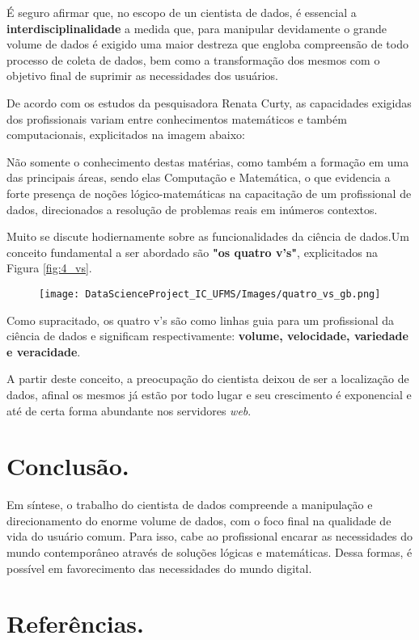 \documentclass[12pt]{article}
\begin{document}
É seguro afirmar que, no escopo de un cientista de dados, é essencial a \textbf{interdisciplinalidade}
a medida que, para manipular devidamente o grande volume de dados é exigido uma maior destreza que engloba compreensão de todo processo de coleta de dados, bem como a transformação dos mesmos com o objetivo final de suprimir as necessidades dos usuários.

De acordo com os estudos da pesquisadora Renata Curty, as capacidades exigidas dos profissionais variam entre conhecimentos matemáticos e também computacionais, explicitados na imagem abaixo:

Não somente o conhecimento destas matérias, como também a formação em uma das principais áreas, sendo elas Computação e Matemática, o que evidencia a forte presença de noções lógico-matemáticas na capacitação de um profissional de dados, direcionados a resolução de problemas reais em inúmeros contextos.

Muito se discute hodiernamente sobre as funcionalidades da ciência de dados.Um conceito fundamental  a ser abordado são \textbf{"os quatro v's"}, explicitados na Figura \ref{fig:4_vs}.

\begin{figure}
    \centering
    \texttt{[image: DataScienceProject\_IC\_UFMS/Images/quatro\_vs\_gb.png]}
\end{figure}

Como supracitado, os quatro v's são como linhas guia para um profissional da ciência de dados e significam respectivamente: \textbf{volume, velocidade, variedade e veracidade}.

A partir deste conceito, a preocupação do cientista deixou de ser a localização de dados, afinal os mesmos já estão por todo lugar e seu crescimento é exponencial e até de certa forma abundante nos servidores \textit{web}.

\section{Conclusão.}

Em síntese, o trabalho do cientista de dados compreende a manipulação e direcionamento do enorme volume de dados, com o foco final na qualidade de vida do usuário comum. Para isso, cabe ao profissional encarar as necessidades do mundo contemporâneo através de soluções lógicas e matemáticas. Dessa formas, é possível em favorecimento das necessidades do mundo digital.

\section{Referências.}
\end{document}
